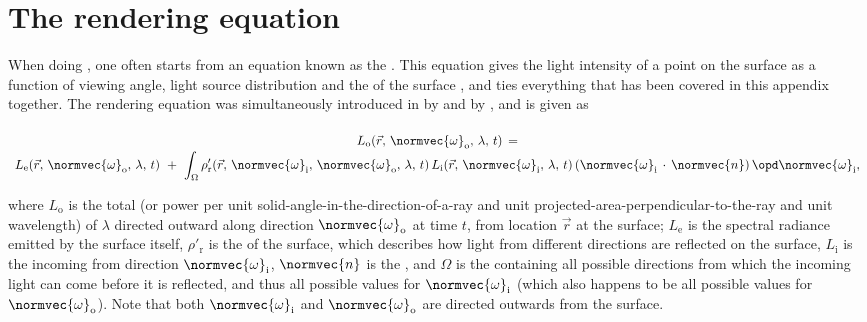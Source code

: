 \section{The rendering equation}

When doing , one often starts from an equation known as the . This equation gives the light intensity of a point on the surface as a function of viewing angle, light source distribution and the \BRDF of the surface \citep{Nicodemus1965}, and ties everything that has been covered in this appendix together. The rendering equation was simultaneously introduced in  by \citet{Immel1986} and by \citet{Kajiya1986}, and is given as

\begin{equation} \label{eq:rendering_equation_original}
\renewcommand*{\arraystretch}{1.5}
\begin{array}{c}
L_{\text{o}}(\vec{r},\,\normvec{\omega}_{\text{o}},\, \lambda,\, t) \,= \\
\displaystyle L_{\text{e}}(\vec{r},\, \normvec{\omega}_{\text{o}},\, \lambda,\, t) \ + \ \int_\Omega \rho'_{\text{r}}(\vec{r},\, \normvec{\omega}_{\text{i}},\, \normvec{\omega}_{\text{o}},\, \lambda,\, t)\, L_{\text{i}}(\vec{r},\, \normvec{\omega}_{\text{i}},\, \lambda,\, t)\, (\normvec{\omega}_{\text{i}}\,\cdot\,\normvec{n})\, \opd \normvec{\omega}_{\text{i}},
\end{array}
\end{equation}

where $L_{\text{o}}$ is the total  (or power per unit solid-angle-in-the-direction-of-a-ray and unit projected-area-perpendicular-to-the-ray and unit wavelength) of  $\lambda$ directed outward along direction $\normvec{\omega}_{\text{o}}$ at time $t$, from location $\vec{r}$ at the surface; $L_{\text{e}}$ is the spectral radiance emitted by the surface itself, $\rho'_{\text{r}}$ is the \BRDF of the surface, which describes how light from different directions are reflected on the surface, $L_{\text{i}}$ is the  incoming from direction $\normvec{\omega}_{\text{i}}$, $\normvec{n}$ is the , and $\Omega$ is the  containing all possible directions from which the incoming light can come before it is reflected, and thus all possible values for $\normvec{\omega}_{\text{i}}$ (which also happens to be all possible values for $\normvec{\omega}_{\text{o}}$). Note that both $\normvec{\omega}_{\text{i}}$ and $\normvec{\omega}_{\text{o}}$ are directed outwards from the surface.

